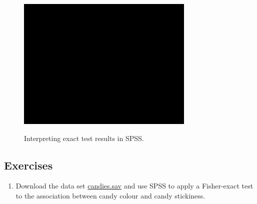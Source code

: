 \documentclass[a4paper]{book}
\providecommand{\tightlist}{%
  \setlength{\itemsep}{0pt}\setlength{\parskip}{0pt}}
\theoremstyle{definition}
\theoremstyle{definition}
\theoremstyle{definition}
\theoremstyle{remark}
\begin{document}
\begin{figure}[H]
\href{https://www.youtube.com/embed/B-I6T4gCdsM}{\includegraphics[width=320px]{GentleIntro_files/figure-latex/SPSSExact2-1} }\caption{Interpreting exact test results in SPSS.}\label{fig:SPSSExact2}
\end{figure}

\subsection{Exercises}\label{exercises-1}

\begin{enumerate}
\def\labelenumi{\arabic{enumi}.}
\tightlist
\item
  Download the data set
  \href{http://82.196.4.233:3838/data/candies.sav}{candies.sav} and use
  SPSS to apply a Fisher-exact test to the association between candy
  colour and candy stickiness.
\end{enumerate}
\end{document}
